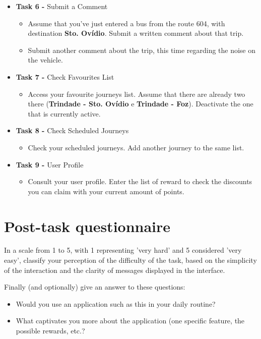 \begin{itemize}
\item \textbf{Task 6 -} Submit a Comment

\begin{itemize}
\item Assume that you've just entered a bus from the route 604, with destination \textbf{Sto. Ovídio}. Submit a written comment about that trip.

\item Submit another comment about the trip, this time regarding the noise on the vehicle.
\end{itemize}

\item \textbf{Task 7 -} Check Favourites List

\begin{itemize}
\item Access your favourite journeys list. Assume that there are already two there (\textbf{Trindade - Sto. Ovídio} e \textbf{Trindade - Foz}). Deactivate the one that is currently active.
\end{itemize}

\item \textbf{Task 8 -} Check Scheduled Journeys

\begin{itemize}
\item Check your scheduled journeys. Add another journey to the same list.
\end{itemize}

\item \textbf{Task 9 -} User Profile

\begin{itemize}
\item Consult your user profile. Enter the list of reward to check the discounts you can claim with your current amount of points.
\end{itemize}

\end{itemize}


\section{Post-task questionnaire}

In a scale from 1 to 5, with 1 representing 'very hard' and 5 considered 'very easy', classify your perception of the difficulty of the task, based on the simplicity of the interaction and the clarity of messages displayed in the interface.

Finally (and optionally) give an answer to these questions:

\begin{itemize}
\item Would you use an application such as this in your daily routine?
\item What captivates you more about the application (one specific feature, the possible rewards, etc.?
\end{itemize}